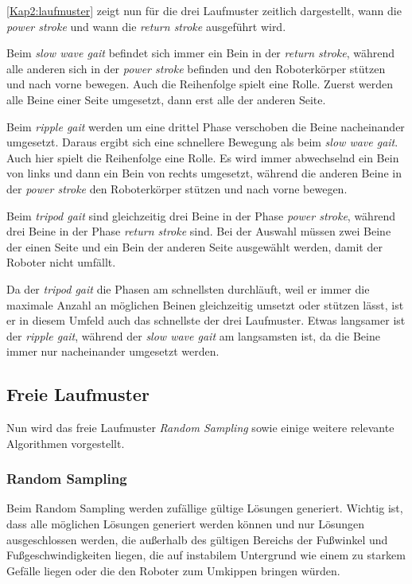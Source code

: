 \autoref{Kap2:laufmuster} zeigt nun für die drei Laufmuster zeitlich dargestellt, wann die \emph{power stroke} und wann die \emph{return stroke} ausgeführt wird.

Beim \emph{slow wave gait} befindet sich immer ein Bein in der \emph{return stroke}, während alle anderen sich in der \emph{power stroke} befinden und den Roboterkörper stützen und nach vorne bewegen. Auch die Reihenfolge spielt eine Rolle. Zuerst werden alle Beine einer Seite umgesetzt, dann erst alle der anderen Seite.

Beim \emph{ripple gait} werden um eine drittel Phase verschoben die Beine nacheinander umgesetzt. Daraus ergibt sich eine schnellere Bewegung als beim \emph{slow wave gait}. Auch hier spielt die Reihenfolge eine Rolle. Es wird immer abwechselnd ein Bein von links und dann ein Bein von rechts umgesetzt, während die anderen Beine in der \emph{power stroke} den Roboterkörper stützen und nach vorne bewegen.

Beim \emph{tripod gait} sind gleichzeitig drei Beine in der Phase \emph{power stroke}, während drei Beine in der Phase \emph{return stroke} sind. Bei der Auswahl müssen zwei Beine der einen Seite und ein Bein der anderen Seite ausgewählt werden, damit der Roboter nicht umfällt.

Da der \emph{tripod gait} die Phasen am schnellsten durchläuft, weil er immer die maximale Anzahl an möglichen Beinen gleichzeitig umsetzt oder stützen lässt, ist er in diesem Umfeld auch das schnellste der drei Laufmuster. Etwas langsamer ist der \emph{ripple gait}, während der \emph{slow wave gait} am langsamsten ist, da die Beine immer nur nacheinander umgesetzt werden.

\subsection{Freie Laufmuster}

Nun wird das freie Laufmuster \emph{Random Sampling} sowie einige weitere relevante Algorithmen vorgestellt. \autocite{herms2004}


\subsubsection{Random Sampling}

Beim Random Sampling werden zufällige gültige Lösungen generiert.  Wichtig ist, dass alle möglichen Lösungen generiert werden können und nur Lösungen ausgeschlossen werden, die außerhalb des gültigen Bereichs der Fußwinkel und Fußgeschwindigkeiten liegen, die auf instabilem Untergrund wie einem zu starkem Gefälle liegen oder die den Roboter zum Umkippen bringen würden.


